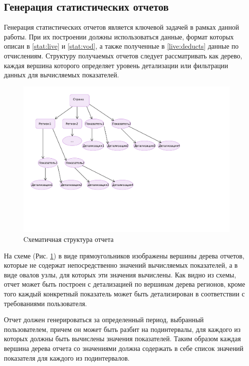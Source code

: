 \subsection{Генерация статистических отчетов}
Генерация статистических отчетов является ключевой задачей в рамках данной работы. При их построении должны использоваться
данные, формат которых описан в \ref{stat:live} и \ref{stat:vod}, а также полученные в \ref{live:deducts}
данные по отчислениям. 
Структуру получаемых отчетов следует рассматривать как дерево, каждая вершина которого определяет уровень детализации
или фильтрации данных для вычисляемых показателей.

\begin{figure}[!ht]
\begin{center}
\hspace*{-1cm} \includegraphics[scale=0.6, trim=0mm 50mm 70mm 0mm, clip]{../resources/uml/ReportScheme.pdf}
\caption{Cхематичная структура отчета}
\label{gr:report:scheme}
\end{center}
\end{figure} 

На схеме (Рис. \ref{gr:report:scheme}) в виде прямоугольников изображены вершины дерева отчетов,
которые не содержат непосредственно значений вычисляемых показателей, а в виде овалов узлы,
для которых эти значения вычислены. Как видно из схемы, отчет может быть построен с детализацией 
по вершинам дерева регионов, кроме того каждый конкретный показатель может быть детализирован
в соответствии с требованиями пользователя.

Отчет должен генерироваться за определенный период, выбранный пользователем, причем он может быть 
разбит на подинтервалы, для каждого из которых должны быть вычислены значения показателей.
Таким образом каждая вершина дерева отчета со значениями должна содержать в себе список 
значений показателя для каждого из подинтервалов.

